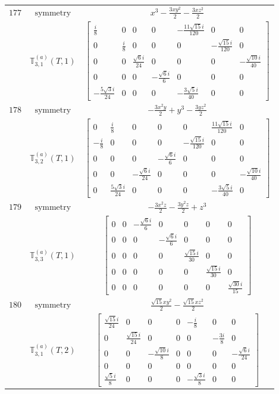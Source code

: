 \documentclass[fleqn,8pt,landscape]{jsarticle}
\begin{document}
\begin{longtable}{ccc}
$ 177 $ & $ \text{symmetry} $ & $ x^{3} - \frac{3 x y^{2}}{2} - \frac{3 x z^{2}}{2} $ \\
$  $ & $ \mathbb{T}_{3,1}^{(a)}(T,1) $ & $ \begin{bmatrix} \frac{i}{8} & 0 & 0 & 0 & - \frac{11 \sqrt{15} i}{120} & 0 & 0 \\ 0 & \frac{i}{8} & 0 & 0 & 0 & - \frac{\sqrt{15} i}{120} & 0 \\ 0 & 0 & \frac{\sqrt{6} i}{24} & 0 & 0 & 0 & - \frac{\sqrt{10} i}{40} \\ 0 & 0 & 0 & - \frac{\sqrt{6} i}{6} & 0 & 0 & 0 \\ - \frac{5 \sqrt{3} i}{24} & 0 & 0 & 0 & - \frac{3 \sqrt{5} i}{40} & 0 & 0 \end{bmatrix} $ \\ \hline
$ 178 $ & $ \text{symmetry} $ & $ - \frac{3 x^{2} y}{2} + y^{3} - \frac{3 y z^{2}}{2} $ \\
$  $ & $ \mathbb{T}_{3,2}^{(a)}(T,1) $ & $ \begin{bmatrix} 0 & \frac{i}{8} & 0 & 0 & 0 & \frac{11 \sqrt{15} i}{120} & 0 \\ - \frac{i}{8} & 0 & 0 & 0 & - \frac{\sqrt{15} i}{120} & 0 & 0 \\ 0 & 0 & 0 & - \frac{\sqrt{6} i}{6} & 0 & 0 & 0 \\ 0 & 0 & - \frac{\sqrt{6} i}{24} & 0 & 0 & 0 & - \frac{\sqrt{10} i}{40} \\ 0 & \frac{5 \sqrt{3} i}{24} & 0 & 0 & 0 & - \frac{3 \sqrt{5} i}{40} & 0 \end{bmatrix} $ \\ \hline
$ 179 $ & $ \text{symmetry} $ & $ - \frac{3 x^{2} z}{2} - \frac{3 y^{2} z}{2} + z^{3} $ \\
$  $ & $ \mathbb{T}_{3,3}^{(a)}(T,1) $ & $ \begin{bmatrix} 0 & 0 & - \frac{\sqrt{6} i}{6} & 0 & 0 & 0 & 0 \\ 0 & 0 & 0 & - \frac{\sqrt{6} i}{6} & 0 & 0 & 0 \\ 0 & 0 & 0 & 0 & \frac{\sqrt{15} i}{30} & 0 & 0 \\ 0 & 0 & 0 & 0 & 0 & \frac{\sqrt{15} i}{30} & 0 \\ 0 & 0 & 0 & 0 & 0 & 0 & \frac{\sqrt{30} i}{15} \end{bmatrix} $ \\ \hline
$ 180 $ & $ \text{symmetry} $ & $ \frac{\sqrt{15} x y^{2}}{2} - \frac{\sqrt{15} x z^{2}}{2} $ \\
$  $ & $ \mathbb{T}_{3,1}^{(a)}(T,2) $ & $ \begin{bmatrix} \frac{\sqrt{15} i}{24} & 0 & 0 & 0 & - \frac{i}{8} & 0 & 0 \\ 0 & \frac{\sqrt{15} i}{24} & 0 & 0 & 0 & - \frac{3 i}{8} & 0 \\ 0 & 0 & - \frac{\sqrt{10} i}{8} & 0 & 0 & 0 & - \frac{\sqrt{6} i}{24} \\ 0 & 0 & 0 & 0 & 0 & 0 & 0 \\ \frac{\sqrt{5} i}{8} & 0 & 0 & 0 & - \frac{\sqrt{3} i}{8} & 0 & 0 \end{bmatrix} $ \\ \hline

\end{longtable}
\end{document}

